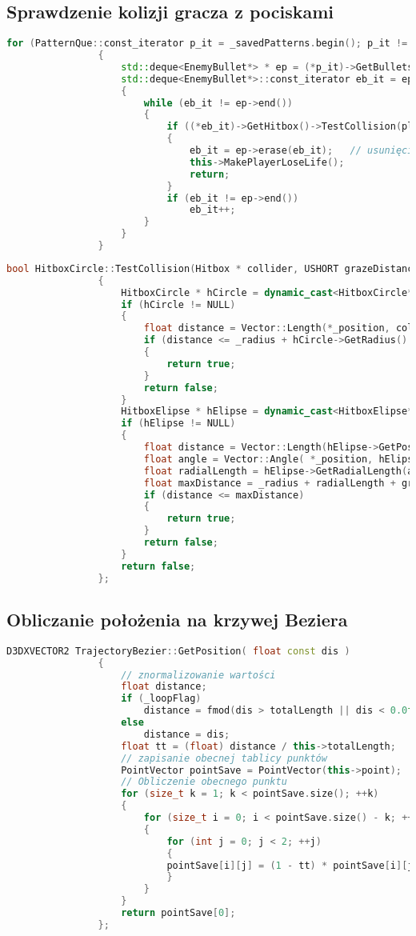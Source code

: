 		\subsection{Sprawdzenie kolizji gracza z pociskami}
			\begin{lstlisting}[language=C++]
				for (PatternQue::const_iterator p_it = _savedPatterns.begin(); p_it != _savedPatterns.end(); ++p_it)
				{
					std::deque<EnemyBullet*> * ep = (*p_it)->GetBullets();
					std::deque<EnemyBullet*>::const_iterator eb_it = ep->begin();
					{
						while (eb_it != ep->end())
						{
							if ((*eb_it)->GetHitbox()->TestCollision(player->GetHitbox()))
							{
								eb_it = ep->erase(eb_it);	// usunięcie pocisku z kolejki
								this->MakePlayerLoseLife();
								return;
							}
							if (eb_it != ep->end())
								eb_it++;
						}
					}
				}
			\end{lstlisting}
			\begin{lstlisting}[language=C++]
				bool HitboxCircle::TestCollision(Hitbox * collider, USHORT grazeDistance)
				{
					HitboxCircle * hCircle = dynamic_cast<HitboxCircle*>(collider);
					if (hCircle != NULL)
					{
						float distance = Vector::Length(*_position, collider->GetPosition());
						if (distance <= _radius + hCircle->GetRadius() + grazeDistance)
						{
							return true;
						}
						return false;
					}
					HitboxElipse * hElipse = dynamic_cast<HitboxElipse*>(collider);
					if (hElipse != NULL)
					{
						float distance = Vector::Length(hElipse->GetPosition(), *_position);
						float angle = Vector::Angle( *_position, hElipse->GetPosition());
						float radialLength = hElipse->GetRadialLength(angle);
						float maxDistance = _radius + radialLength + grazeDistance;
						if (distance <= maxDistance)
						{
							return true;
						}
						return false;
					}
					return false;
				};
			\end{lstlisting}
		\subsection{Obliczanie położenia na krzywej Beziera}
			\begin{lstlisting}[language=C++]
				D3DXVECTOR2 TrajectoryBezier::GetPosition( float const dis )
				{
					// znormalizowanie wartości
					float distance;
					if (_loopFlag)
						distance = fmod(dis > totalLength || dis < 0.0f ? fmod(dis + totalLength, totalLength) : dis, totalLength);
					else
						distance = dis;
					float tt = (float) distance / this->totalLength;
					// zapisanie obecnej tablicy punktów
					PointVector pointSave = PointVector(this->point);
					// Obliczenie obecnego punktu
					for (size_t k = 1; k < pointSave.size(); ++k)
					{
						for (size_t i = 0; i < pointSave.size() - k; ++i)
						{
							for	(int j = 0; j < 2; ++j)
							{
							pointSave[i][j] = (1 - tt) * pointSave[i][j] + tt * pointSave[i + 1][j];
							}
						}
					}
					return pointSave[0];
				};
			\end{lstlisting}
